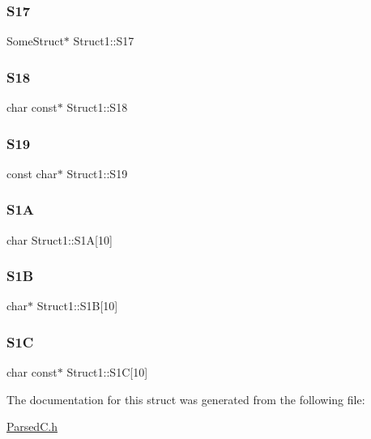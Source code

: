 \mbox{\label{structStruct1_a0b1fc8567906ca443688e94d01589064}} 
\subsubsection{\texorpdfstring{S17}{S17}}
{\footnotesize\ttfamily Some\+Struct$\ast$ Struct1\+::\+S17}

\mbox{\label{structStruct1_aca681fbabd712288a75280ae511e3fc1}} 
\subsubsection{\texorpdfstring{S18}{S18}}
{\footnotesize\ttfamily char const$\ast$ Struct1\+::\+S18}

\mbox{\label{structStruct1_a31b80270ff0d1a01aad2c27a4a55377e}} 
\subsubsection{\texorpdfstring{S19}{S19}}
{\footnotesize\ttfamily const char$\ast$ Struct1\+::\+S19}

\mbox{\label{structStruct1_a67451c56b7de613f0cbc5834854e04e4}} 
\subsubsection{\texorpdfstring{S1A}{S1A}}
{\footnotesize\ttfamily char Struct1\+::\+S1A\mbox{[}10\mbox{]}}

\mbox{\label{structStruct1_a7275b7b9103247c4731f8f849bbd3cc2}} 
\subsubsection{\texorpdfstring{S1B}{S1B}}
{\footnotesize\ttfamily char$\ast$ Struct1\+::\+S1B\mbox{[}10\mbox{]}}

\mbox{\label{structStruct1_a861259f7512616e2a7603ab735c7f5c0}} 
\subsubsection{\texorpdfstring{S1C}{S1C}}
{\footnotesize\ttfamily char const$\ast$ Struct1\+::\+S1C\mbox{[}10\mbox{]}}



The documentation for this struct was generated from the following file\+:\begin{DoxyCompactItemize}
\item 
\hyperlink{ParsedC_8h}{Parsed\+C.\+h}\end{DoxyCompactItemize}
